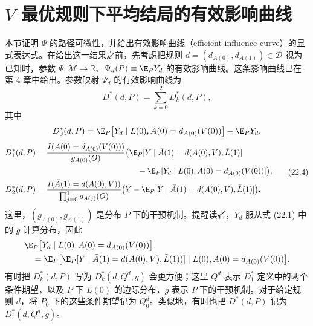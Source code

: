 \section{$V$ 最优规则下平均结局的有效影响曲线}

本节证明 $\Psi$ 的路径可微性，并给出有效影响曲线（efficient influence curve）的显式表达式。在给出这一结果之前，先考虑把规则 $d=(d_{A(0)},d_{A(1)})\in\mathcal D$ 视为已知时，参数 $\Psi:\mathcal M\to\mathbb R$、$\Psi_d(P)\equiv\E_PY_d$ 的有效影响曲线。这条影响曲线已在第 4 章中给出。参数映射 $\Psi_d$ 的有效影响曲线为
\[
 D^*(d,P)=\sum_{k=0}^2D_k^*(d,P),
\]
其中
\[
 D_0^*(d,P)=\E_P\bigl[Y_d\mid L(0),A(0)=d_{A(0)}(V(0))\bigr]-\E_PY_d,
\]
\begin{equation}
\begin{aligned}
 D_1^*(d,P)
 &=\frac{I(A(0)=d_{A(0)}(V(0)))}{g_{A(0)}(O)}
 \bigl(\E_P[Y\mid\bar A(1)=d(A(0),V),\bar L(1)]\\
 &\hspace{4.5cm}-\E_P[Y_d\mid L(0),A(0)=d_{A(0)}(V(0))]\bigr),\\
 D_2^*(d,P)
 &=\frac{I(\bar A(1)=d(A(0),V))}{\prod_{j=0}^1g_{A(j)}(O)}
 \bigl(Y-\E_P[Y\mid\bar A(1)=d(A(0),V),\bar L(1)]\bigr).
\end{aligned}
\tag{22.4}
\end{equation}
这里，$(g_{A(0)},g_{A(1)})$ 是分布 $P$ 下的干预机制。提醒读者，$Y_d$ 服从式 (22.1) 中的 $g$ 计算分布，因此
\[
\begin{aligned}
 &\E_P\bigl[Y_d\mid L(0),A(0)=d_{A(0)}(V(0))\bigr]\\
 &\quad=\E_P\bigl[\E_P[Y\mid\bar A(1)=d(A(0),V),\bar L(1))]
 \mid L(0),A(0)=d_{A(0)}(V(0))\bigr].
\end{aligned}
\]
有时把 $D_k^*(d,P)$ 写为 $D_k^*(d,Q^d,g)$ 会更方便；这里 $Q^d$ 表示 $D_1^*$ 定义中的两个条件期望，以及 $P$ 下 $L(0)$ 的边际分布，$g$ 表示 $P$ 下的干预机制。对于给定规则 $d$，将 $P_0$ 下的这些条件期望记为 $Q_0^d$。类似地，有时也把 $D^*(d,P)$ 记为 $D^*(d,Q^d,g)$。

